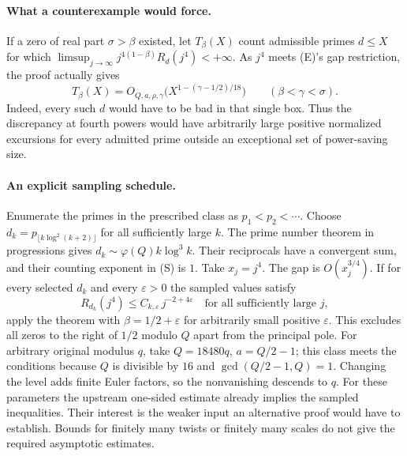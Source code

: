 \paragraph{What a counterexample would force.}
If a zero of real part $\sigma>\beta$ existed, let $T_\beta(X)$ count
admissible primes $d\le X$ for which
$\limsup_{j\to\infty}j^{4(1-\beta)}R_d(j^4)<+\infty$.
As $j^4$ meets (E)'s gap restriction, the proof actually gives
\[
 T_\beta(X)=O_{Q,a,\rho,\gamma}
 \bigl(X^{1-(\gamma-1/2)/18}\bigr)
 \qquad(\beta<\gamma<\sigma).
\]
Indeed, every such $d$ would have to be bad in that single box.
Thus the discrepancy at fourth powers would have arbitrarily large
positive normalized excursions for every admitted prime outside
an exceptional set of power-saving size.

\paragraph{An explicit sampling schedule.}
Enumerate the primes in the prescribed class as $p_1<p_2<\cdots$.
Choose $d_k=p_{\lfloor k\log^2(k+2)\rfloor}$ for all sufficiently large
$k$. The prime number theorem in progressions gives
$d_k\sim\varphi(Q)k\log^3 k$. Their reciprocals have a convergent sum,
and their counting exponent in (S) is $1$. Take $x_j=j^4$.
The gap is $O(x_j^{3/4})$. If for every selected $d_k$ and every
$\varepsilon>0$ the sampled values satisfy
\[
 R_{d_k}(j^4)\le C_{k,\varepsilon}\,j^{-2+4\varepsilon}
 \quad\text{for all sufficiently large }j,
\]
apply the theorem with $\beta=1/2+\varepsilon$ for arbitrarily small
positive $\varepsilon$. This excludes all zeros to the right of $1/2$
modulo $Q$ apart from the principal pole. For arbitrary original modulus
$q$, take $Q=18480q$, $a=Q/2-1$; this class meets the conditions because
$Q$ is divisible by $16$ and $\gcd(Q/2-1,Q)=1$. Changing the level adds
finite Euler factors, so the nonvanishing descends to $q$. For these
parameters the upstream one-sided estimate already implies the sampled
inequalities. Their interest is the weaker input an alternative proof
would have to establish. Bounds for finitely many twists or finitely many
scales do not give the required asymptotic estimates.
